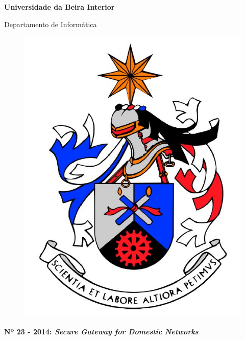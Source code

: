 
\thispagestyle{empty}
\setcounter{page}{-1}

\begin{center}
\begin{Huge}
\textbf{Universidade da Beira Interior}
\end{Huge}
\end{center}

\begin{center}
\begin{Huge}
Departamento de Informática
\end{Huge}
\end{center}

\vspace{0,07cm}
\begin{figure}[!htb]
\centering
\includegraphics[scale=0.3]{brasaoubi.JPG}
\end{figure}

\vspace{0.5cm}
\begin{center}
\begin{Large}
\textbf{Nº 23 - 2014: \emph{Secure Gateway for Domestic Networks}}
\end{Large}
\end{center}


